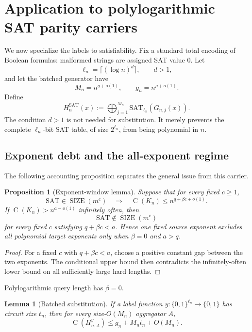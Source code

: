 \documentclass[11pt]{article}
\newtheorem{lemma}[theorem]{Lemma}
\newtheorem{proposition}[theorem]{Proposition}
\theoremstyle{definition}
\newcommand{\bits}{\{0,1\}}
\newcommand{\SIZE}{\operatorname{SIZE}}
\newcommand{\Ckt}{\operatorname{C}}
\newcommand{\SAT}{\mathrm{SAT}}
\begin{document}
\section{Application to polylogarithmic SAT parity carriers}\label{sec:sat}

We now specialize the labels to satisfiability.  Fix a standard total encoding of Boolean formulas: malformed strings are assigned SAT value $0$.  Let
\[
  \ell_n=\lceil(\log n)^d\rceil,
  \qquad d>1,
\]
and let the batched generator have
\[
  M_n=n^{q+o(1)},
  \qquad
  g_n=n^{\rho+o(1)}.
\]
Define
\begin{equation}\label{eq:sat-carrier}
  H_n^{\SAT}(x)
  :=\bigoplus_{j=1}^{M_n}\SAT_{\ell_n}(G_{n,j}(x)).
\end{equation}
The condition $d>1$ is not needed for substitution.  It merely prevents the complete $\ell_n$-bit SAT table, of size $2^{\ell_n}$, from being polynomial in $n$.

\subsection{Exponent debt and the all-exponent regime}

The following accounting proposition separates the general issue from this carrier.

\begin{proposition}[Exponent-window lemma]\label{prop:window}
Suppose that for every fixed $c\ge1$,
\[
  \SAT\in\SIZE(m^c)
  \quad\Longrightarrow\quad
  \Ckt(K_n)\le n^{q+\beta c+o(1)}.
\]
If $\Ckt(K_n)>n^{a-o(1)}$ infinitely often, then
\[
  \SAT\notin\SIZE(m^c)
\]
for every fixed $c$ satisfying $q+\beta c<a$.  Hence one fixed source exponent excludes all polynomial target exponents only when $\beta=0$ and $a>q$.
\end{proposition}

\begin{proof}
For a fixed $c$ with $q+\beta c<a$, choose a positive constant gap between the two exponents.  The conditional upper bound then contradicts the infinitely-often lower bound on all sufficiently large hard lengths.
\end{proof}

Polylogarithmic query length has $\beta=0$.

\begin{lemma}[Batched substitution]\label{lem:substitution}
If a label function $y:\bits^{\ell_n}\to\bits$ has circuit size $t_n$, then for every size-$O(M_n)$ aggregator $A$,
\[
  \Ckt(H_{n,A}^{y})
  \le g_n+M_nt_n+O(M_n).
\]
\end{lemma}
\end{document}
